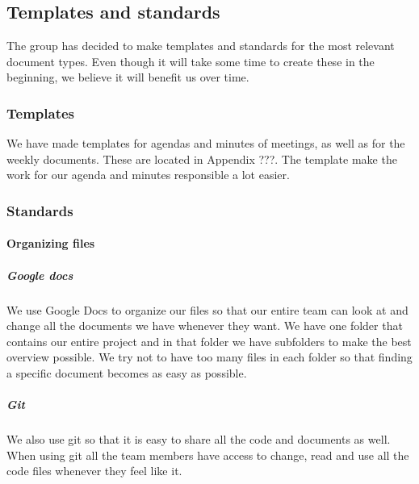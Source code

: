 \subsection{Templates and standards}
The group has decided to make templates and standards for the most relevant document types. Even though it will take some time to create these in the beginning, we believe it will benefit us over time.

\subsubsection{Templates}
We have made templates for agendas and minutes of meetings, as well as for the weekly documents. These are located in Appendix ???. The template make the work for our agenda and minutes responsible a lot easier.

\subsubsection{Standards}

\paragraph{Organizing files}
\subparagraph{Google docs}\hfill
\newline
We use Google Docs to organize our files so that our entire team can look at and change all the documents we have whenever they want. We have one folder that contains our entire project and in that folder we have subfolders to make the best overview possible. We try not to have too many files in each folder so that finding a specific document becomes as easy as possible.

\subparagraph{Git}\hfill 
\newline
We also use git so that it is easy to share all the code and documents as well. When using \gls{git} all the team members have access to change, read and use all the code files whenever they feel like it.

